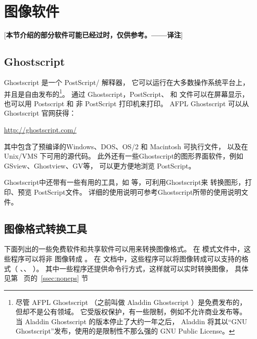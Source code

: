 \section{图像软件}\label{sec:graphicsoftware}
[{\bfseries 本节介绍的部分软件可能已经过时，仅供参考。——译注}]
\subsection{Ghostscript}\label{ssec:gs}
Ghostscript 是一个 PostScript/ 解释器，
它可以运行在大多数操作系统平台上，并且是自由发布的\footnote{
	尽管 AFPL Ghostscript （之前叫做 Aladdin Ghostscript ）是免费发布的，
	但却不是公有领域。
	它受版权保护，有一些限制，例如不允许商业发布等。
	当 Aladdin Ghostscript 的版本停止了大约一年之后，
	Aladdin 将其以“GNU Ghostscript”发布，使用的是限制性不那么强的 GNU Public License。}。
通过 Ghostscript，PostScript、 和  文件可以在屏幕显示，
也可以用 Postscript 和 非 PostScript 打印机来打印。
AFPL Ghostscript 可以从 Ghostscript 官网获得：
\begin{center}
	\url{http://ghostscript.com/}
\end{center}
其中包含了预编译的Windows、DOS、OS/2 和 Macintosh 可执行文件，
以及在 Unix/VMS 下可用的源代码。
此外还有一些Ghostscript的图形界面软件，例如GSview、Ghostview、GV等，
可以更方便地浏览 PostScript。

Ghostscript中还带有一些有用的工具，如  等，可利用Ghostscript来
转换图形，打印、预览 PostScript文件。
详细的使用说明可参考Ghostscript所带的使用说明文件。

\subsection{图像格式转换工具}\label{ssec:convertor}

下面列出的一些免费软件和共享软件可以用来转换图像格式。
在  模式文件中，这些程序可以将非 图像转成 。
在 \pdfLaTeX{} 文档中，这些程序可以将图像转成可以支持的格式（ 、、 ）。
其中一些程序还提供命令行方式，这样就可以实时转换图像，
具体见第~\pageref{ssec:noneps} 页的~\ref{ssec:noneps} 节

